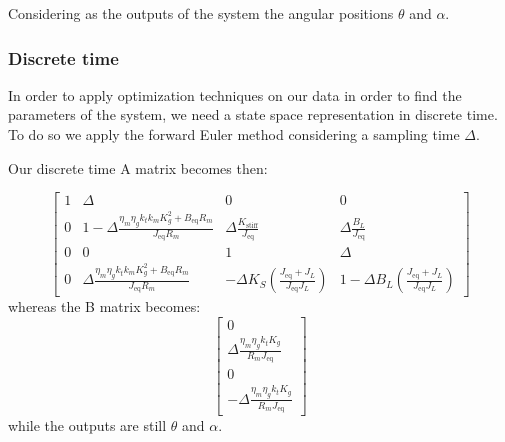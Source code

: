                Considering as the outputs of the system the angular positions $\theta$ and $\alpha$.

            \subsubsection{Discrete time}

                In order to apply optimization techniques on our data in order to find the parameters of the system, we need a state space representation in discrete time. To do so we apply the forward Euler method considering a sampling time $\Delta$.

                Our discrete time A matrix becomes then:

                \begin{equation*}
                    \left\lbrack \begin{array}{cccc}
                        1 & \Delta  & 0 & 0\\
                        0 & 1-\Delta \frac{\eta_m \eta_g k_t k_m K_g^2 +B_{\mathrm{eq}} R_m }{J_{\mathrm{eq}} R_m } & \Delta \frac{K_{\mathrm{stiff}} }{J_{\mathrm{eq}} } & \Delta \frac{B_L }{J_{\mathrm{eq}} }\\
                        0 & 0 & 1 & \Delta \\
                        0 & \Delta \frac{\eta_m \eta_g k_t k_m K_g^2 +B_{\mathrm{eq}} R_m }{J_{\mathrm{eq}} R_m } & -{\Delta K}_S \left(\frac{J_{\mathrm{eq}} +J_{L} }{J_{\mathrm{eq}} J_{L} }\right) & 1-{\Delta B}_L \left(\frac{J_{\mathrm{eq}} +J_{L} }{J_{\mathrm{eq}} J_{L} }\right)
                    \end{array}\right\rbrack 
                \end{equation*}
                whereas the B matrix becomes:       
                \begin{equation*}
                    \left\lbrack\begin{array}{c}
                        0\\
                        \Delta \frac{\eta_m \eta_g k_t K_g }{R_m J_{\mathrm{eq}} }\\
                        0\\
                        -\Delta \frac{\eta_m \eta_g k_t K_g }{R_m J_{\mathrm{eq}} }
                    \end{array}\right\rbrack
                \end{equation*}
                while the outputs are still $\theta$ and $\alpha$.

